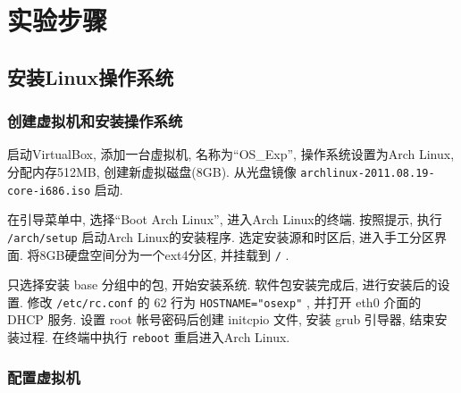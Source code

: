 \documentclass[11pt]{report}
\begin{document}
    \section{实验步骤}

        \subsection{安装Linux操作系统}

            \subsubsection{创建虚拟机和安装操作系统}

                启动VirtualBox, 添加一台虚拟机, 名称为``OS\_Exp'', 操作系统设置为Arch Linux, 分配内存512MB, 创建新虚拟磁盘(8GB). 从光盘镜像 \verb|archlinux-2011.08.19-core-i686.iso| 启动.

                在引导菜单中, 选择``Boot Arch Linux'', 进入Arch Linux的终端. 按照提示, 执行 \verb|/arch/setup| 启动Arch Linux的安装程序. 选定安装源和时区后, 进入手工分区界面. 将8GB硬盘空间分为一个ext4分区, 并挂载到 \verb|/| .

                只选择安装 base 分组中的包, 开始安装系统. 软件包安装完成后, 进行安装后的设置. 修改 \verb|/etc/rc.conf| 的 62 行为 \verb|HOSTNAME="osexp"| , 并打开 eth0 介面的 DHCP 服务. 设置 root 帐号密码后创建 initcpio 文件, 安装 grub 引导器, 结束安装过程. 在终端中执行 \verb|reboot| 重启进入Arch Linux.

            \subsubsection{配置虚拟机}
\end{document}
